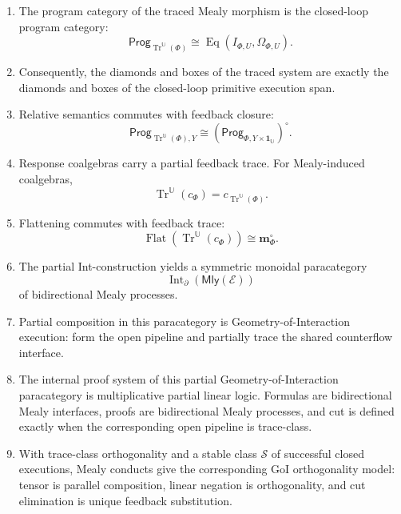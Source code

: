 \begin{theorem}
\begin{enumerate}
\item The program category of the traced Mealy morphism is the closed-loop
program category:
\[
\mathsf{Prog}_{\operatorname{Tr}^{\mathbb U}(\Phi)}
\cong
\operatorname{Eq}(I_{\Phi,U},\Omega_{\Phi,U}).
\]

\item Consequently, the diamonds and boxes of the traced system are exactly
the diamonds and boxes of the closed-loop primitive execution span.

\item Relative semantics commutes with feedback closure:
\[
\mathsf{Prog}_{\operatorname{Tr}^{\mathbb U}(\Phi),Y}
\cong
\left(
\mathsf{Prog}_{\Phi,Y\times\mathbf 1_{\mathbb U}}
\right)^\circ.
\]

\item Response coalgebras carry a partial feedback trace.  For Mealy-induced
coalgebras,
\[
\operatorname{Tr}^{\mathbb U}(c_\Phi)
=
c_{\operatorname{Tr}^{\mathbb U}(\Phi)}.
\]

\item Flattening commutes with feedback trace:
\[
\operatorname{Flat}
\left(
\operatorname{Tr}^{\mathbb U}(c_\Phi)
\right)
\cong
\mathbf m_{\Phi}^{\circ}.
\]

\item The partial Int-construction yields a symmetric monoidal paracategory
\[
\operatorname{Int}_{\partial}(\mathsf{Mly}(\mathcal E))
\]
of bidirectional Mealy processes.

\item Partial composition in this paracategory is Geometry-of-Interaction
execution: form the open pipeline and partially trace the shared counterflow
interface.

\item The internal proof system of this partial Geometry-of-Interaction
paracategory is multiplicative partial linear logic.  Formulas are
bidirectional Mealy interfaces, proofs are bidirectional Mealy processes, and
cut is defined exactly when the corresponding open pipeline is trace-class.

\item With trace-class orthogonality and a stable class
\(\mathcal S\) of successful closed executions, Mealy conducts give the
corresponding GoI orthogonality model: tensor is parallel composition, linear
negation is orthogonality, and cut elimination is unique feedback substitution.
\end{enumerate}
\end{theorem}

